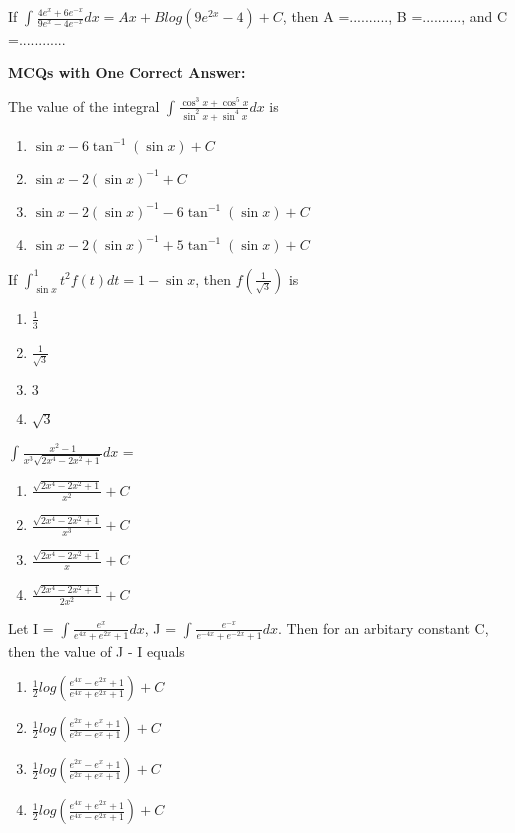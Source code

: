 
\item If $\int_{}\frac{4e^{x} + 6e^{-x}}{9e^{x} - 4e^{-x}}dx = Ax + Blog(9e^{2x} - 4) + C$, then A =.........., B =.........., and C =............

\textbf{ MCQs with One Correct Answer:}
\item The value of the integral $\int_{}\frac{\cos^{3}x + \cos^{5}x}{\sin^{2}x + \sin^{4}x}dx$ is
\begin{enumerate}
\item $\sin x - 6\tan^{-1}(\sin x) + C$
\item $\sin x - 2(\sin x)^{-1} + C$
\item $\sin x - 2(\sin x)^{-1} - 6\tan^{-1}(\sin x) + C$
\item $\sin x - 2(\sin x)^{-1} + 5\tan^{-1}(\sin x) + C$
\end{enumerate}

\item If $\int_{\sin x}^{1}t^{2}f(t)dt = 1 - \sin x$, then $f(\frac{1}{\sqrt{3}})$ is
\begin{enumerate}
\item $\frac{1}{3}$
\item $\frac{1}{\sqrt{3}}$
\item $3$
\item $\sqrt{3}$
\end{enumerate}

\item $\int_{}\frac{x^2 - 1}{x^3\sqrt{2x^4 - 2x^2 + 1}}dx$ =
\begin{enumerate}
\item $\frac{\sqrt{2x^4 - 2x^2 + 1}}{x^2} + C$
\item $\frac{\sqrt{2x^4 - 2x^2 + 1}}{x^3} + C$
\item $\frac{\sqrt{2x^4 - 2x^2 + 1}}{x} + C$
\item $\frac{\sqrt{2x^4 - 2x^2 + 1}}{2x^2} + C$
\end{enumerate}

\item Let I = $\int_{}\frac{e^x}{e^{4x} + e^{2x} + 1}dx$, J = $\int_{}\frac{e^{-x}}{e^{-4x} + e^{-2x} + 1}dx$. Then for an arbitary constant C, then the value of J - I equals
\begin{enumerate}
\item $\frac{1}{2}log(\frac{e^{4x} - e^{2x} + 1}{e^{4x} + e^{2x} + 1}) + C$
\item $\frac{1}{2}log(\frac{e^{2x} + e^{x} + 1}{e^{2x} - e^{x} + 1}) + C$
\item $\frac{1}{2}log(\frac{e^{2x} - e^{x} + 1}{e^{2x} + e^{x} + 1}) + C$
\item $\frac{1}{2}log(\frac{e^{4x} + e^{2x} + 1}{e^{4x} - e^{2x} + 1}) + C$
\end{enumerate}

